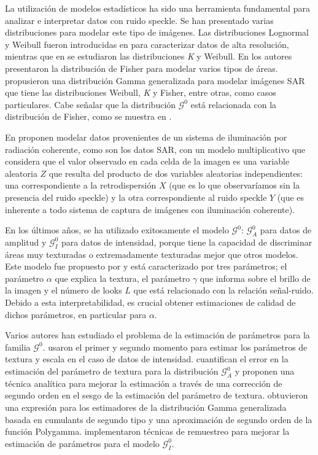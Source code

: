 La utilización de modelos estadísticos ha sido una herramienta fundamental para analizar e interpretar datos con ruido speckle. Se han presentado varias distribuciones para modelar este tipo de imágenes. Las distribuciones Lognormal y Weibull fueron introducidas en \citet{oliverquegan98} para caracterizar datos de alta resolución, mientras que en \citet{Oliver1993} se estudiaron las distribuciones \textit{K} y Weibull. En \citet{Tison2004} los autores presentaron la distribución de Fisher para modelar varios tipos de áreas. \citet{Li2011} propusieron una distribución Gamma generalizada para modelar imágenes SAR que tiene las distribuciones Weibull, \textit{K} y Fisher, entre otras, como casos particulares. Cabe señalar que la distribución $\mathcal{G}^0$ está relacionada con la distribución de Fisher, como se muestra en \citet{MejailJacoboFreryBustos:IJRS}.

En \citet{oliverquegan98} proponen modelar datos provenientes de un sistema de iluminación por radiación coherente, como son los datos SAR, con un modelo multiplicativo que considera que el valor observado en cada celda de la imagen es una variable aleatoria $Z$ que resulta del producto de dos variables aleatorias independientes: una correspondiente a la retrodispersión $X$ (que es lo que observaríamos sin la presencia del ruido speckle) y la otra correspondiente al ruido speckle $Y$ (que es inherente a todo sistema de captura de imágenes con iluminación coherente). 

En los últimos años, se ha utilizado exitosamente el modelo $\mathcal{G}^0$: $\mathcal{G}_A^0$ para datos de amplitud y $\mathcal G_I^0$ para datos de intensidad, porque tiene la capacidad de discriminar áreas muy texturadas o extremadamente texturadas mejor que otros modelos. Este modelo fue propuesto por \citet{Frery97} y está caracterizado por tres parámetros; el parámetro $\alpha$ que explica la textura, el parámetro $\gamma $ que informa sobre el brillo de la imagen y el número de looks $L$ que está relacionado con la relación señal-ruido.
Debido a esta interpretabilidad, es crucial obtener estimaciones de calidad de dichos parámetros, en particular para $\alpha$.

Varios autores han estudiado el problema de la estimación de parámetros para la familia $\mathcal G^0$. \citet{Freitas2005} usaron el primer y segundo momento para estimar los parámetros de textura y escala en el caso de datos de intensidad.
 \citet{VasconcellosFrerySilva:CompStat} cuantifican el error en la estimación del parámetro de textura para la distribución $\mathcal G_A^0$ y proponen una técnica analítica para mejorar la estimación a través de una corrección de segundo orden en el sesgo de la estimación del parámetro de textura. \citet{Li2011} obtuvieron una expresión para los estimadores de la distribución Gamma generalizada basada en cumulants de segundo tipo y una aproximación de segundo orden de la función Polygamma. \citet{CribariFrerySilva:CSDA} implementaron técnicas de remuestreo para mejorar la estimación de parámetros para el modelo $\mathcal G_I^0$.

